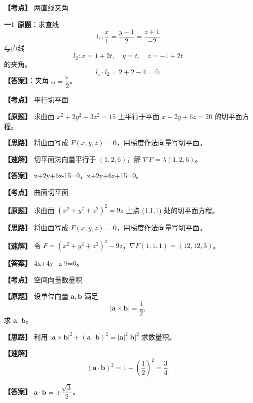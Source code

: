 ﻿\documentclass[11pt,a4paper,UTF8]{ctexart}
\begin{document}
\begin{answerbox}[2024--2025 一-1]
\textbf{【考点】} 两直线夹角

\textbf{一1 原题}：求直线
\[
l_1:\frac{x}{1}=\frac{y-1}{2}=\frac{z+1}{-2}
\]
与直线
\[
l_2:x=1+2t,\quad y=t,\quad z=-1+2t
\]
的夹角。
\[
l_1\cdot l_2=2+2-4=0.
\]
\textbf{【答案】}：夹角 $\alpha=\dfrac{\pi}{2}$。

\end{answerbox}

\newpage

\begin{answerbox}[2024--2025 三]
\textbf{【考点】} 平行切平面

\textbf{【原题】} 求曲面 $x^2+2y^2+3z^2=15$ 上平行于平面 $x+2y+6z=20$ 的切平面方程。

\textbf{【思路】} 将曲面写成 $F(x,y,z)=0$，用梯度作法向量写切平面。

\textbf{【速解】} 切平面法向量平行于 $(1,2,6)$，解 $\nabla F=\lambda(1,2,6)$。

\textbf{【答案】} x+2y+6z-15=0，x+2y+6z+15=0。
\end{answerbox}

\begin{answerbox}[2023--2024 一-4]
\textbf{【考点】} 曲面切平面

\textbf{【原题】} 求曲面 $(x^2+y^2+z^2)^2=9z$ 上点 (1,1,1) 处的切平面方程。

\textbf{【思路】} 将曲面写成 $F(x,y,z)=0$，用梯度作法向量写切平面。

\textbf{【速解】} 令 $F=(x^2+y^2+z^2)^2-9z$，$\nabla F(1,1,1)=(12,12,3)$。

\textbf{【答案】} 4x+4y+z-9=0。
\end{answerbox}

\begin{answerbox}[2022--2023 一-1]
\textbf{【考点】} 空间向量数量积

\textbf{【原题】} 设单位向量 $\boldsymbol a,\boldsymbol b$ 满足
\[
|\boldsymbol a\times \boldsymbol b|=\frac12,
\]
求 $\boldsymbol a\cdot \boldsymbol b$。

\textbf{【思路】} 利用 $|\boldsymbol a\times\boldsymbol b|^2+(\boldsymbol a\cdot\boldsymbol b)^2=|\boldsymbol a|^2|\boldsymbol b|^2$ 求数量积。

\textbf{【速解】}
\[
(\boldsymbol a\cdot\boldsymbol b)^2
=1-\left(\frac12\right)^2=\frac34.
\]

\textbf{【答案】} $\boldsymbol a\cdot\boldsymbol b=\pm\dfrac{\sqrt3}{2}$。
\end{answerbox}
\end{document}
